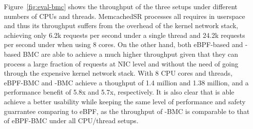 Figure~\ref{fig:eval-bmc} shows the throughput of the three setups under
    different numbers of CPUs and threads.
MemcachedSR processes all requires in userspace and thus its throughput suffers
    from the overhead of the kernel network stack, achieving only 6.2k requests
    per second under a single thread and 24.2k requests per second under when
    using 8 cores.
On the other hand, both eBPF-based and \projname{}-based BMC are able to
    achieve a much higher throughput given that they can process a large
    fraction of requests at NIC level and without the need of going through
    the expensive kernel network stack.
With 8 CPU cores and threads, eBPF-BMC and \projname{}-BMC achieve a thoughput
    of 1.4 million and 1.38 million, and a performance benefit of 5.8x and
    5.7x, respectively.
It is also clear that \projname{} is able achieve a better usability while
    keeping the same level of performance and safety guarrantee comparing to
    eBPF,  as the throughput of \projname{}-BMC is comparable to that of
    eBPF-BMC under all CPU/thread setups.